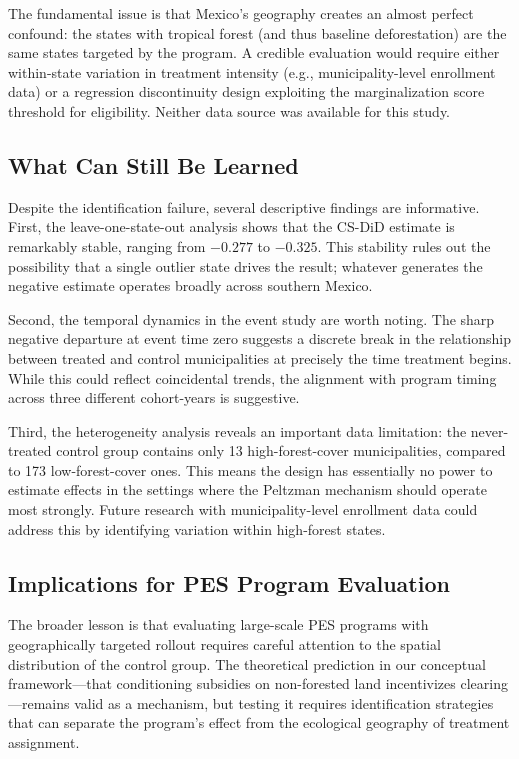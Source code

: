 \documentclass[12pt]{article}
\begin{document}
The fundamental issue is that Mexico's geography creates an almost perfect confound: the states with tropical forest (and thus baseline deforestation) are the same states targeted by the program. A credible evaluation would require either within-state variation in treatment intensity (e.g., municipality-level enrollment data) or a regression discontinuity design exploiting the marginalization score threshold for eligibility. Neither data source was available for this study.

\subsection{What Can Still Be Learned}

Despite the identification failure, several descriptive findings are informative. First, the leave-one-state-out analysis shows that the CS-DiD estimate is remarkably stable, ranging from $-0.277$ to $-0.325$. This stability rules out the possibility that a single outlier state drives the result; whatever generates the negative estimate operates broadly across southern Mexico.

Second, the temporal dynamics in the event study are worth noting. The sharp negative departure at event time zero suggests a discrete break in the relationship between treated and control municipalities at precisely the time treatment begins. While this could reflect coincidental trends, the alignment with program timing across three different cohort-years is suggestive.

Third, the heterogeneity analysis reveals an important data limitation: the never-treated control group contains only 13 high-forest-cover municipalities, compared to 173 low-forest-cover ones. This means the design has essentially no power to estimate effects in the settings where the Peltzman mechanism should operate most strongly. Future research with municipality-level enrollment data could address this by identifying variation within high-forest states.

\subsection{Implications for PES Program Evaluation}

The broader lesson is that evaluating large-scale PES programs with geographically targeted rollout requires careful attention to the spatial distribution of the control group. The theoretical prediction in our conceptual framework---that conditioning subsidies on non-forested land incentivizes clearing---remains valid as a mechanism, but testing it requires identification strategies that can separate the program's effect from the ecological geography of treatment assignment.
\end{document}
